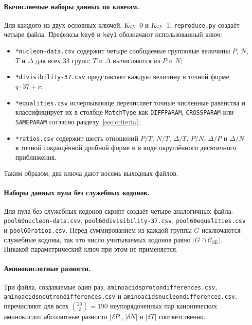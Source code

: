 \documentclass[11pt,a4paper]{article}
\renewcommand{\_}{\origunderscore\allowbreak}
\begin{document}
\paragraph{Вычисляемые наборы данных по ключам.}
Для каждого из двух основных ключей, Key~0 и Key~1,
\texttt{reproduce.py} создаёт четыре файла. Префиксы
\texttt{key0\_} и \texttt{key1\_} обозначают использованный ключ:
\begin{itemize}
  \item \texttt{*\_nucleon-data.csv} содержит четыре сообщаемые
        групповые величины $P$, $N$, $T$ и $\Delta$ для всех $33$
        групп; $T$ и $\Delta$ вычисляются из $P$ и $N$;
  \item \texttt{*\_divisibility-37.csv} представляет каждую
        величину в точной форме $q\cdot37+r$;
  \item \texttt{*\_equalities.csv} исчерпывающе перечисляет точные
        численные равенства и классифицирует их в столбце
        \texttt{Match\_Type} как \texttt{DIFF\_PARAM},
        \texttt{CROSS\_PARAM} или \texttt{SAME\_PARAM} согласно
        разделу~\ref{sec:criteria};
  \item \texttt{*\_ratios.csv} содержит шесть отношений
        $P/T$, $N/T$, $\Delta/T$, $P/N$, $\Delta/P$ и $\Delta/N$
        в точной сокращённой дробной форме и в виде округлённого
        десятичного приближения.
\end{itemize}
Таким образом, два ключа дают восемь выходных файлов.

\paragraph{Наборы данных пула без служебных кодонов.}
Для пула без служебных кодонов скрипт создаёт четыре аналогичных
файла:
\texttt{pool60\_nucleon-data.csv},
\texttt{pool60\_divisibility-37.csv},
\texttt{pool60\_equalities.csv} и
\texttt{pool60\_ratios.csv}. Перед суммированием из каждой группы $G$
исключаются служебные кодоны, так что число учитываемых кодонов равно
$|G\cap\mathcal{C}_{\mathrm{SE}}|$. Никакой параметрический ключ при
этом не применяется.

\paragraph{Аминокислотные разности.}
Три файла, создаваемые один раз,
\texttt{amino\_acids\_proton\_differences.csv},
\texttt{amino\_acids\_neutron\_differences.csv} и
\texttt{amino\_acids\_nucleon\_differences.csv}, перечисляют для
всех $\binom{20}{2}=190$ неупорядоченных пар канонических
аминокислот абсолютные разности $|\delta P|$, $|\delta N|$ и
$|\delta T|$ соответственно.
\end{document}
